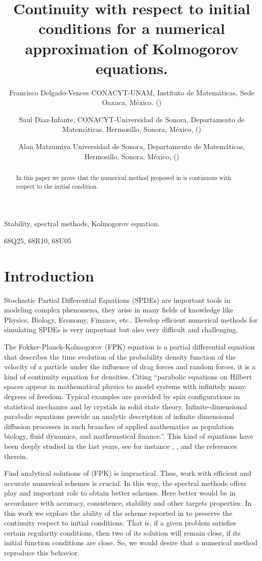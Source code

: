 \documentclass[review, onefignum, onetabnum]{siamart171218}
\title{%
    Continuity with respect to initial conditions for a numerical
    approximation of Kolmogorov equations.
}
\author{
    Francisco Delgado-Vences
    CONACYT-UNAM,
    Instituto de Matem\'aticas,
    Sede Oaxaca, M\'exico.
    (\email{delgado@im.unam.mx})
%
    \and
    Saul Diaz-Infante,
    CONACYT-Universidad
    de Sonora, Departamento de Matem\'aticas.
    Hermosillo, Sonora, M\'exico,
    (\email{saul.diazinfante@unison.mx})
%
    \and
    Alan Matzumiya
    Universidad de Sonora,
    Departamento de Matem\'aticas,
    Hermosillo, Sonora, M\'exico,
    (\email{alan.matzumiya@gmail.com})
}
\begin{document}
\maketitle

\begin{abstract}
    In this paper we prove that the numerical method proposed in \cite{de-fl}
    is continuous with respect to the initial condition.
\end{abstract}

\begin{keywords}
    Stability, spectral methods, Kolmogorov equation.
\end{keywords}

\begin{AMS}
  68Q25, 68R10, 68U05
\end{AMS}

\section{Introduction}
    Stochastic Partial Differential Equations (SPDEs) are important tools in
modeling complex phenomena, they arise in many fields of knowledge like
Physics, Biology, Economy, Finance, etc.. Develop efficient numerical
methods for simulating SPDEs is very important but also very difficult and
challenging.

    The  Fokker-Planck-Kolmogorov (FPK) equation is a partial differential
equation that describes the time evolution of the probability density function
of the velocity of a particle under the influence of drag forces and random
forces, it is a kind of continuity equation for densities. Citing \cite{da-za}
``parabolic equations on Hilbert spaces appear in mathematical physics to model
systems with infinitely many degrees of freedom. Typical examples are provided
by spin configurations in statistical mechanics and by crystals in solid state
theory. Infinite-dimensional parabolic equations provide an analytic description
of infinite dimensional diffusion processes in such branches of applied
mathematics as population biology, fluid dynamics, and mathematical finance.''.
This kind of equations have been deeply studied in the last years, see for
instance \cite{bo-da-ro}, \cite{da-fl-ro}, \cite{da} and the references therein.

    Find analytical solutions of (FPK) is impractical. Thus, work with efficient
and accurate numerical schemes is crucial. In this way, the spectral methods
offers play and important role to obtain better schemes. Here better would 
be in accordance with accuracy, consistence, stability and other targets 
properties. In this work we explore the ability of the scheme reported in
\cite{de-fl} to preserve the continuity respect to initial conditions. That is,
if a given problem satisfies certain regularity conditions, then two of its 
solution will remain close, if its initial function conditions are close. So, 
we would desire that a numerical method reproduce this behavior.
\end{document}
